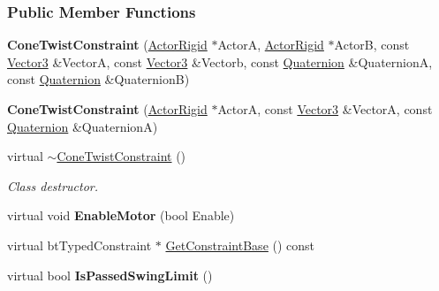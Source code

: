\subsubsection*{Public Member Functions}
\begin{DoxyCompactItemize}
\item 
\hypertarget{classMezzanine_1_1ConeTwistConstraint_ade6711300f4f4622f49752cfcbf81494}{
{\bfseries ConeTwistConstraint} (\hyperlink{classMezzanine_1_1ActorRigid}{ActorRigid} $\ast$ActorA, \hyperlink{classMezzanine_1_1ActorRigid}{ActorRigid} $\ast$ActorB, const \hyperlink{classMezzanine_1_1Vector3}{Vector3} \&VectorA, const \hyperlink{classMezzanine_1_1Vector3}{Vector3} \&Vectorb, const \hyperlink{classMezzanine_1_1Quaternion}{Quaternion} \&QuaternionA, const \hyperlink{classMezzanine_1_1Quaternion}{Quaternion} \&QuaternionB)}
\label{classMezzanine_1_1ConeTwistConstraint_ade6711300f4f4622f49752cfcbf81494}

\item 
\hypertarget{classMezzanine_1_1ConeTwistConstraint_ac875c5b0481a945f314bd3ea54c872f8}{
{\bfseries ConeTwistConstraint} (\hyperlink{classMezzanine_1_1ActorRigid}{ActorRigid} $\ast$ActorA, const \hyperlink{classMezzanine_1_1Vector3}{Vector3} \&VectorA, const \hyperlink{classMezzanine_1_1Quaternion}{Quaternion} \&QuaternionA)}
\label{classMezzanine_1_1ConeTwistConstraint_ac875c5b0481a945f314bd3ea54c872f8}

\item 
virtual \hyperlink{classMezzanine_1_1ConeTwistConstraint_a69d510c9f0292b160d9f129f6d2db7f8}{$\sim$ConeTwistConstraint} ()
\begin{DoxyCompactList}\small\item\em Class destructor. \item\end{DoxyCompactList}\item 
\hypertarget{classMezzanine_1_1ConeTwistConstraint_a83208911e81d36201375e6a9f8b21d1d}{
virtual void {\bfseries EnableMotor} (bool Enable)}
\label{classMezzanine_1_1ConeTwistConstraint_a83208911e81d36201375e6a9f8b21d1d}

\item 
virtual btTypedConstraint $\ast$ \hyperlink{classMezzanine_1_1ConeTwistConstraint_a4b478db86131128394899dca6c2191aa}{GetConstraintBase} () const 
\item 
\hypertarget{classMezzanine_1_1ConeTwistConstraint_a62d162e8083c50e5b74219de6578d2ea}{
virtual bool {\bfseries IsPassedSwingLimit} ()}
\label{classMezzanine_1_1ConeTwistConstraint_a62d162e8083c50e5b74219de6578d2ea}


\end{DoxyCompactItemize}
